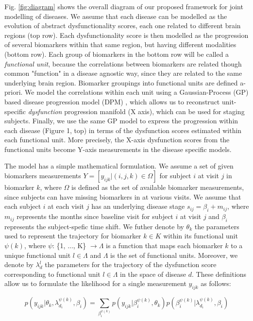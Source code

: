 \documentclass{llncs}
\begin{document}
Fig. \ref{fig:diagram} shows the overall diagram of our proposed framework for joint modelling of diseases. We assume that each disease can be modelled as the evolution of abstract dysfunctionality scores, each one related to different brain regions (top row). Each dysfunctionality score is then modelled as the progression of several biomarkers within that same region, but having different modalities (bottom row). Each group of biomarkers in the bottom row will be called a \emph{functional unit}, because the correlations between biomarkers are related though common "function" in a disease agnostic way, since they are related to the same underlying brain region. Biomarker groupings into functional units are defined a-priori. We model the correlations within each unit using a Gaussian-Process (GP) based disease progression model (DPM) \cite{lorenzi2017disease}, which allows us to reconstruct unit-specific \emph{dysfunction} progression manifold (X axis), which can be used for staging subjects. Finally, we use the same GP model to express the progression within each disease (Figure 1, top) in terms of the dysfunction scores estimated within each functional unit. More precisely, the X-axis dysfunction scores from the functional units become Y-axis measurements in the disease specific models.

The model has a simple mathematical formulation. We assume a set of given biomarkers measurements $Y = [y_{ijk} | (i,j,k) \in \Omega]$ for subject $i$ at visit $j$ in biomarker $k$, where $\Omega$ is defined as the set of available biomarker measurements, since subjects can have missing biomarkers in at various visits. We assume that each subject $i$ at each visit $j$ has an underlying disease stage $s_{ij} = \beta_i + m_{ij}$, where $m_{ij}$ represents the months since baseline visit for subject $i$ at visit $j$ and $\beta_i$ represents the subject-spefic time shift. We futher denote by $\theta_k$ the parameters used to represent the trajectory for biomarker $k \in K$ within its functional unit $\psi(k)$, where $\psi$: \{1, ..., K\} $ \rightarrow \Lambda$ is a function that maps each biomarker $k$ to a unique functional unit $l \in \Lambda$ and $\Lambda$ is the set of functional units. Moreover, we denote by $\lambda_d^l$ the parameters for the trajectory of the dysfunction score corresponding to functional unit $l \in \Lambda$ in the space of disease $d$. These definitions allow us to formulate the likelihood for a single measurement $y_{ijk}$ as follows:

\begin{equation}
 p(y_{ijk}|\theta_k, \lambda_{d_i}^{\psi(k)}, \beta_i) = \sum_{\beta_i^{\psi(k)}} p(y_{ijk}| \beta_i^{\psi(k)}, \theta_k) p(\beta_i^{\psi(k)}| \lambda_{d_i}^{\psi(k)}, \beta_i)
\end{equation}
\end{document}

